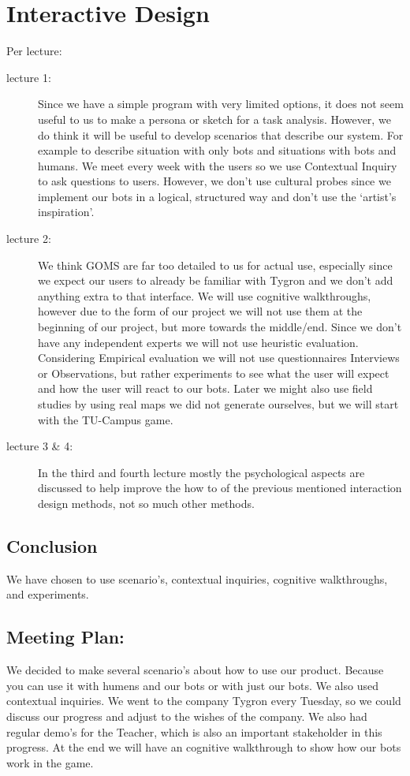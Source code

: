 \section{Interactive Design}

Per lecture:

\begin{description}

\item[lecture 1:]
Since we have a simple program with very limited options, it does not seem useful to us to make a persona or sketch for a task analysis.
However, we do think it will be useful to develop scenarios that describe our system. For example to describe situation with only bots and situations with bots and humans.
We meet every week with the users so we use Contextual Inquiry to ask questions to users. However, we don’t use cultural probes since we implement our bots in a logical, structured way and don’t use the ‘artist’s inspiration’.

\item[lecture 2:]
We think GOMS are far too detailed to us for actual use, especially since we expect our users to already be familiar with Tygron and we don’t add anything extra to that interface. 
We will use cognitive walkthroughs, however due to the form of our project we will not use them at the beginning of our project, but more towards the middle/end. 
Since we don’t have any independent experts we will not use heuristic evaluation. 
Considering Empirical evaluation we will not use questionnaires Interviews or Observations, but rather experiments to see what the user will expect and how the user will react to our bots. Later we might also use field studies by using real maps we did not generate ourselves, but we will start with the TU-Campus game.


\item[lecture 3 \& 4:]
In the third and fourth lecture mostly the psychological aspects are discussed to help improve the how to of the previous mentioned interaction design methods, not so much other methods.

\end{description}

\subsection{Conclusion}
We have chosen to use scenario's, contextual inquiries, cognitive walkthroughs, and experiments.

\subsection{Meeting Plan:}
We decided to make several scenario's about how to use our product. Because you can use it with humens and our bots or with just our bots. 
We also used contextual inquiries. We went to the company Tygron every Tuesday, so we could discuss our progress and adjust to the wishes of the company. We also had regular demo's for the Teacher, which is also an important stakeholder in this progress. At the end we will have an cognitive walkthrough to show how our bots work in the game.  